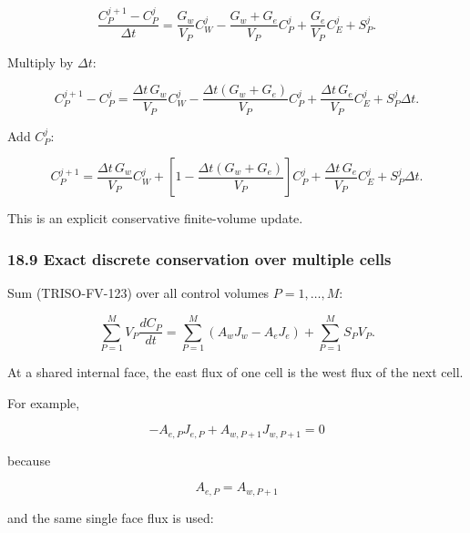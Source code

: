 \documentclass[11pt,a4paper]{article}
\begin{document}
\begin{equation}
\frac{
C_P^{j+1}-C_P^j
}{
\Delta t
}
=
\frac{G_w}{V_P}C_W^j
-
\frac{G_w+G_e}{V_P}C_P^j
+
\frac{G_e}{V_P}C_E^j
+
S_P^j.
\tag{TRISO-FV-156}
\label{eq:triso-fv-156}
\end{equation}

Multiply by $\Delta t$:

\begin{equation}
C_P^{j+1}-C_P^j
=
\frac{\Delta t\,G_w}{V_P}C_W^j
-
\frac{\Delta t(G_w+G_e)}{V_P}C_P^j
+
\frac{\Delta t\,G_e}{V_P}C_E^j
+
S_P^j\Delta t.
\tag{TRISO-FV-157}
\label{eq:triso-fv-157}
\end{equation}

Add $C_P^j$:

\begin{equation}
\boxed{
C_P^{j+1}
=
\frac{\Delta t\,G_w}{V_P}C_W^j
+
\left[
1-
\frac{\Delta t(G_w+G_e)}{V_P}
\right]C_P^j
+
\frac{\Delta t\,G_e}{V_P}C_E^j
+
S_P^j\Delta t.
}
\tag{TRISO-FV-158}
\label{eq:triso-fv-158}
\end{equation}

This is an explicit conservative finite-volume update.

\subsubsection*{18.9 Exact discrete conservation over multiple cells}

Sum (TRISO-FV-123) over all control volumes $P=1,\ldots,M$:

\begin{equation}
\sum_{P=1}^{M}
V_P\frac{dC_P}{dt}
=
\sum_{P=1}^{M}
(A_wJ_w-A_eJ_e)
+
\sum_{P=1}^{M}S_PV_P.
\tag{TRISO-FV-159}
\label{eq:triso-fv-159}
\end{equation}

At a shared internal face, the east flux of one cell is the west flux of the next cell.

For example,

\begin{equation}
-A_{e,P}J_{e,P}
+
A_{w,P+1}J_{w,P+1}
=
0
\tag{TRISO-FV-160}
\label{eq:triso-fv-160}
\end{equation}

because

\begin{equation}
A_{e,P}=A_{w,P+1}
\tag{TRISO-FV-161}
\label{eq:triso-fv-161}
\end{equation}

and the same single face flux is used:
\end{document}
